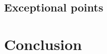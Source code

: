 \documentclass[10pt, a4paper, singlespacing, headsepline]{article}
\newcommand\PT{\textit{PT}}
\begin{document}

\subsection{Exceptional points}







\section{Conclusion}
\blindtext
\end{document}
